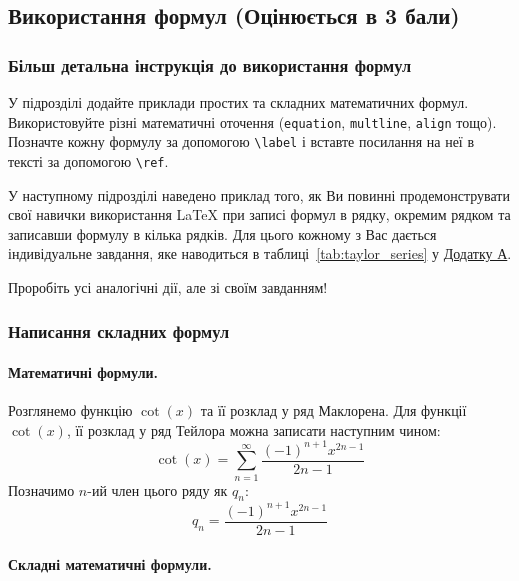 	\subsection{Використання формул (Оцінюється в 3 бали)}
	
	
	\subsubsection{Більш детальна інструкція до використання формул}
	
	У підрозділі додайте приклади простих та складних математичних формул. Використовуйте різні математичні оточення (\texttt{equation}, \texttt{multline}, \texttt{align} тощо). Позначте кожну формулу за допомогою \texttt{\textbackslash label} і вставте посилання на неї в тексті за допомогою \texttt{\textbackslash ref}.
	
	У наступному підрозділі наведено приклад того, як Ви повинні продемонструвати свої навички використання LaTeX при записі формул в рядку, окремим рядком та записавши формулу в кілька рядків. Для цього кожному з Вас дається індивідуальне завдання, яке наводиться в таблиці~\ref{tab:taylor_series} у  \hyperref[sec:appendix1]{Додатку А}.
	
	Проробіть усі аналогічні дії, але зі своїм завданням!
	
	\subsubsection{Написання складних формул}
	
	\paragraph{Математичні формули.}
	
	Розглянемо функцію  \( \cot(x)\) та її розклад у ряд Маклорена. Для функції \( \cot(x)\), її розклад у ряд Тейлора можна записати наступним чином:
	\begin{equation} \label{eq:cot_general}
		 \cot(x) = \sum_{n=1}^{\infty} \frac{(-1)^{n+1} x^{2n-1}}{2n-1} 
	\end{equation}
	Позначимо \( n \)-ий член цього ряду як \( q_n \):
	\begin{equation} \label{eq:q_sum_n}
		q_n = \frac{(-1)^{n+1} x^{2n-1}}{2n-1}
	\end{equation}
	
	\paragraph{Складні математичні формули.}
	
